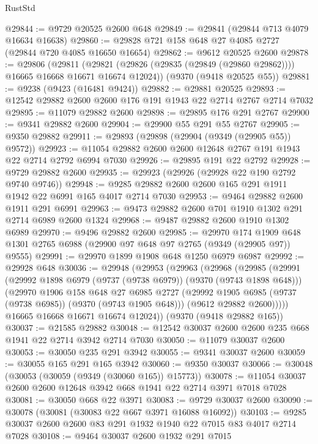 \begin{lexlean}{RustStd}
\begin{coremodule}
@29844 := @9729 @20525 @2600 @648
@29849 := @29841 (@29844 @713 @4079 @16634 @16638)
@29860 := @29828 @721 @158 @648 @27 @4085 @2727 (@29844 @720 @4085 @16650 @16654)
@29862 := @9612 @20525 @2600
@29878 := @29806
    (@29811 (@29821 (@29826 (@29835 (@29849 (@29860 @29862)))) @16665 @16668 @16671 @16674 @12024))
    (@9370 (@9418 @20525 @55))
@29881 := @9238 (@9423 (@16481 @9424))
@29882 := @29881 @20525
@29893 := @12542 @29882 @2600 @2600 @176 @191 @1943 @22 @2714 @2767 @2714 @7032
@29895 := @11079 @29882 @2600
@29898 := @29895 @176 @291 @2767
@29900 := @9341 @29882 @2600
@29904 := @29900 @55 @291 @55 @2767
@29905 := @9350 @29882
@29911 := @29893 (@29898 (@29904 (@9349 (@29905 @55)) @9572))
@29923 := @11054 @29882 @2600 @2600 @12648 @2767 @191 @1943 @22 @2714 @2792 @6994 @7030
@29926 := @29895 @191 @22 @2792
@29928 := @9729 @29882 @2600
@29935 := @29923 (@29926 (@29928 @22 @190 @2792 @9740 @9746))
@29948 := @9285 @29882 @2600 @2600 @165 @291 @1911 @1942 @22 @6991 @165 @4017 @2714 @7030
@29953 := @9464 @29882 @2600 @1911 @291 @6991
@29963 := @9473 @29882 @2600 @701 @1910 @1302 @291 @2714 @6989 @2600 @1324
@29968 := @9487 @29882 @2600 @1910 @1302 @6989
@29970 := @9496 @29882 @2600
@29985 := @29970
    @174
    @1909
    @648
    @1301
    @2765
    @6988
    (@29900 @97 @648 @97 @2765 (@9349 (@29905 @97)) @9555)
@29991 := @29970 @1899 @1908 @648 @1250 @6979 @6987
@29992 := @29928 @648
@30036 := @29948
    (@29953
      (@29963
        (@29968
          (@29985
            (@29991
              (@29992 @1898 @6979 (@9737 (@9738 @6979)) (@9370 (@9743 @1898 @648)))
              (@29970
                @1906
                @158
                @648
                @27
                @6985
                @2727
                (@29992 @1905 @6985 (@9737 (@9738 @6985)) (@9370 (@9743 @1905 @648)))
                (@9612 @29882 @2600)))))
        @16665
        @16668
        @16671
        @16674
        @12024))
    (@9370 (@9418 @29882 @165))
@30037 := @21585 @29882
@30048 := @12542 @30037 @2600 @2600 @235 @668 @1941 @22 @2714 @3942 @2714 @7030
@30050 := @11079 @30037 @2600
@30053 := @30050 @235 @291 @3942
@30055 := @9341 @30037 @2600
@30059 := @30055 @165 @291 @165 @3942
@30060 := @9350 @30037
@30066 := @30048 (@30053 (@30059 (@9349 (@30060 @165)) @15773))
@30078 := @11054 @30037 @2600 @2600 @12648 @3942 @668 @1941 @22 @2714 @3971 @7018 @7028
@30081 := @30050 @668 @22 @3971
@30083 := @9729 @30037 @2600
@30090 := @30078 (@30081 (@30083 @22 @667 @3971 @16088 @16092))
@30103 := @9285 @30037 @2600 @2600 @83 @291 @1932 @1940 @22 @7015 @83 @4017 @2714 @7028
@30108 := @9464 @30037 @2600 @1932 @291 @7015

\end{coremodule}
\end{lexlean}
